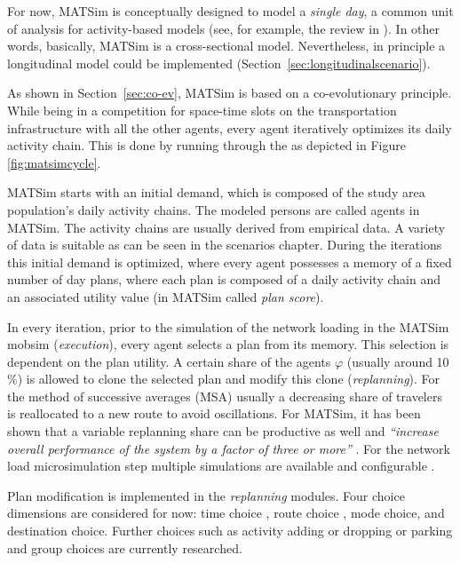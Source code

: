 For now, MATSim is conceptually designed to model a \emph{single day}, a common unit of analysis for activity-based models (see, for example, the review in \citet[][]{Bowman_TEC_2009_1}). In other words, basically, MATSim is a cross-sectional model. Nevertheless, in principle a longitudinal model could be implemented (Section~\ref{sec:longitudinalscenario}).

As shown in Section~\ref{sec:co-ev}, MATSim is based on a co-evolutionary principle. While being in a competition for space-time slots on the transportation infrastructure with all the other agents, every agent iteratively optimizes its daily activity chain. This is done by running through the  as depicted in Figure \ref{fig:matsimcycle}. 

MATSim starts with an initial demand, which is composed of the study area population's daily activity chains. The modeled persons are called agents in MATSim. The activity chains are usually derived from empirical data. A variety of data is suitable as can be seen in the scenarios chapter. During the iterations this initial demand is optimized, where every agent possesses a memory of a fixed number of day plans, where each plan is composed of a daily activity chain and an associated utility value (in MATSim called \emph{plan score}).

In every iteration, prior to the simulation of the network loading in the MATSim \gls{mobsim} \citep[e.g.,][]{Cetin_PhDThesis_2005} (\emph{execution}), every agent selects a plan from its memory. This selection is dependent on the plan utility. A certain share of the agents $\varphi$ (usually around 10$\%$) is allowed to clone the selected plan and modify this clone (\emph{replanning}). For the method of successive averages (MSA) usually a decreasing share of travelers is reallocated to a new route to avoid oscillations. For MATSim, it has been shown that a variable replanning share can be productive as well and \emph{``increase overall performance of the system by a factor of three or more''} \citep[][p.7f]{CharyparEtAl_IATBR_2006}. For the network load microsimulation step multiple simulations are available and configurable \citep[][p.10f]{HorniEtAl_TechRep_IVT_2011_a}. 

Plan modification is implemented in the \emph{replanning} modules. Four choice dimensions are considered for now: time choice \citep[][]{BalmerEtAl_Timmermans_2005}, route choice \citep[]{LefebvreBalmer_STRC_2007}, mode choice, and destination choice. Further choices such as activity adding or dropping or parking and group choices are currently researched. %

